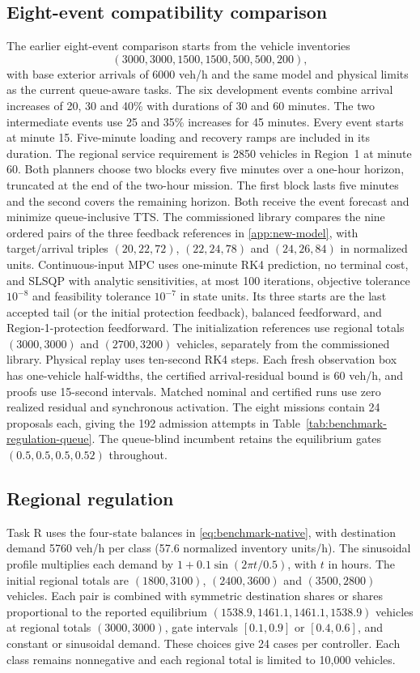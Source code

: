\documentclass[preprint,12pt]{elsarticle}
\newcommand{\appref}[1]{\ref{#1}}
\begin{document}
\subsection{Eight-event compatibility comparison}
\label{app:compatibility-protocol}
The earlier eight-event comparison starts from the vehicle inventories
\[
(3000,3000,1500,1500,500,500,200),
\]
with base exterior arrivals
of 6000 veh/h and the same model and physical limits as the current
queue-aware tasks. The six development events combine arrival increases
of 20, 30 and 40\% with durations of 30 and 60 minutes. The two
intermediate events use 25 and 35\% increases for 45 minutes. Every event
starts at minute 15. Five-minute loading and recovery ramps are included
in its duration. The regional service requirement is 2850 vehicles in
Region~1 at minute 60. Both planners choose two blocks every five minutes
over a one-hour horizon, truncated at the end of the two-hour mission.
The first block lasts five minutes and the second covers the remaining
horizon. Both receive the event forecast and minimize queue-inclusive TTS.
The commissioned library compares the nine ordered pairs of the three
feedback references in \appref{app:new-model}, with target/arrival triples
$(20,22,72)$, $(22,24,78)$ and $(24,26,84)$ in normalized units.
Continuous-input MPC uses one-minute RK4 prediction, no terminal cost,
and SLSQP with analytic sensitivities, at most 100 iterations, objective
tolerance $10^{-8}$ and feasibility tolerance $10^{-7}$ in state units.
Its three starts are the last accepted tail (or the initial protection
feedback), balanced feedforward, and Region-1-protection feedforward.
The initialization references use regional totals $(3000,3000)$ and
$(2700,3200)$ vehicles, separately from the commissioned library.
Physical replay uses ten-second RK4 steps. Each fresh observation box has
one-vehicle half-widths, the certified arrival-residual bound is
60 veh/h, and proofs use 15-second intervals. Matched nominal and
certified runs use zero realized residual and synchronous activation.
The eight missions contain 24 proposals each, giving the 192 admission
attempts in Table~\ref{tab:benchmark-regulation-queue}. The queue-blind
incumbent retains the equilibrium gates $(0.5,0.5,0.5,0.52)$ throughout.

\subsection{Regional regulation}
Task R uses the four-state balances in \eqref{eq:benchmark-native}, with
destination demand 5760 veh/h per class (57.6 normalized inventory units/h). The sinusoidal profile
multiplies each demand by $1+0.1\sin(2\pi t/0.5)$, with $t$ in hours.
The initial regional totals are $(1800,3100)$, $(2400,3600)$ and
$(3500,2800)$ vehicles. Each pair is combined with symmetric destination
shares or shares proportional to the reported equilibrium
$(1538.9,1461.1,1461.1,1538.9)$ vehicles at regional totals $(3000,3000)$,
gate intervals $[0.1,0.9]$ or $[0.4,0.6]$, and constant or sinusoidal
demand. These choices give 24 cases per controller. Each class remains
nonnegative and each regional total is limited to 10,000 vehicles.
\end{document}
